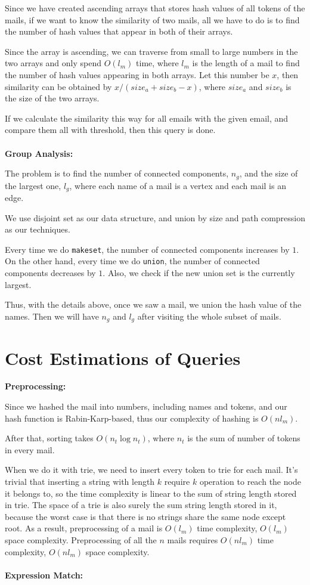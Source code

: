 \documentclass{article}
\begin{document}
Since we have created ascending arrays that stores hash values of all tokens of the mails, if we want to know the similarity of two mails, all we have to do is to find the number of hash values that appear in both of their arrays.

Since the array is ascending, we can traverse from small to large numbers in the two arrays and only spend $O(l_m)$ time, where $l_m$ is the length of a mail to find the number of hash values appearing in both arrays. Let this number be $x$, then similarity can be obtained by $x / (size_a + size_b - x)$, where $size_a$ and $size_b$ is the size of the two arrays.

If we calculate the similarity this way for all emails with the given email, and compare them all with threshold, then this query is done.\\ \\
\textbf{Group Analysis:}

The problem is to find the number of connected components, $n_g$, and the size of the largest one, $l_g$, where each name of a mail is a vertex and each mail is an edge. 

We use disjoint set as our data structure, and union by size and path compression as our techniques.

Every time we do \verb|makeset|, the number of connected components increases by $1$. On the other hand, every time we do \verb|union|, the number of connected components decreases by $1$. Also, we check if the new union set is the currently largest.

Thus, with the details above, once we saw a mail, we union the hash value of the names. Then we will have $n_g$ and $l_g$ after visiting the whole subset of mails.\\


\section*{Cost Estimations of Queries}

\textbf{Preprocessing:}

Since we hashed the mail into numbers, including names and tokens, and our hash function is Rabin-Karp-based, thus our complexity of hashing is $O(nl_m)$.

After that, sorting takes $O(n_t\log{n_t})$, where $n_t$ is the sum of number of tokens in every mail.

When we do it with trie, we need to insert every token to trie for each mail. It's trivial that inserting a string with length $k$ require $k$ operation to reach the node it belongs to, so the time complexity is linear to the sum of string length stored in trie. The space of a trie is also surely the sum string length stored in it, because the worst case is that there is no strings share the same node except root. As a result, preprocessing of a mail is $O(l_m)$ time complexity, $O(l_m)$ space complexity. Preprocessing of all the $n$ mails requires $O(nl_m)$ time complexity, $O(nl_m)$ space complexity.\\ \\
\textbf{Expression Match:}
\end{document}

